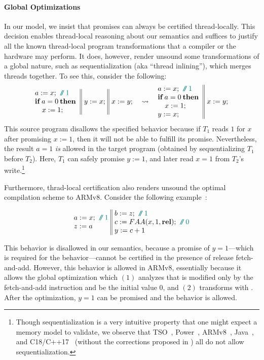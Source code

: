 \paragraph{Global Optimizations}
In our model, we insist that promises can always be certified thread-locally. 
This decision enables thread-local reasoning about our semantics and suffices
to justify all the known thread-local program transformations that a compiler
or the hardware may perform.  It does, however, render unsound some transformations of a global nature,
such as sequentialization (aka ``thread inlining''), which merges threads together.
To see this, consider the following:
$$\inarrIIId{
a:=x; \comment{1} \\
\itne{a=0}{}\\
\quad x:=1;
}{
y:=x;
}{
x:=y;
}\quad
\leadsto
\quad
\inarrIId{
a:=x; \comment{1} \\
\itne{a=0}{}\\
\quad x:=1; \\
y:=x;
}{
x:=y;
}
$$
This source program disallows the specified behavior because if $T_1$ reads $1$ for $x$ after promising $x:=1$, then
it will not be able to fulfill its promise.
Nevertheless, the result $a=1$ \emph{is} allowed in the target program 
(obtained by sequentializing $T_1$ before $T_2$).
Here, $T_1$ can safely promise $y:=1$, and later read $x=1$ from $T_2$'s 
write.\footnote{Though sequentialization is a very intuitive property that one might expect a memory
model to validate,
we observe that TSO~\cite{x86-tso}, Power~\cite{herding-cats}, ARMv8~\cite{arm8-model}, Java~\cite{jmm}, 
and C18/C++17~\cite{Batty:2011} (without the corrections proposed in \cite{c11comp})
all do not allow sequentialization.
}

Furthermore, thrad-local certification also renders unsound the optimal compilation scheme to ARMv8.
Consider the following example~\cite[Example 3.10]{imm}:

$$\inarrIId{
a:=x; \comment{1} \\
z:=a
}{
b:=z; \comment{1} \\
c:=FAA(x,1,\relw); \comment{0} \\
y:=c+1
}
$$

\noindent This behavior is disallowed in our semantics, because a promise of $y = 1$---which is
required for the behavior---cannot be certified in the presence of release fetch-and-add.  However,
this behavior is allowed in ARMv8, essentially because it allows the global optimization which $(1)$
analyzes that  is modified only by the fetch-and-add instruction and  be the initial
value $0$, and $(2)$ transforms  with .  After the optimization, $y=1$ can
be promised and the behavior is allowed.

